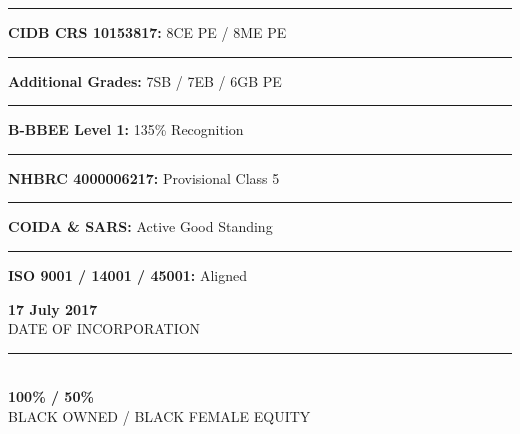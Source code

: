 \documentclass[a4paper,11pt]{article}
\providecommand{\faAward}{\faCertificate}
\begin{document}
\begin{minipage}[t]{0.34\textwidth}
    \vspace{0pt}
    \begin{tcolorbox}[
        enhanced, colback=mhoffwhite, colframe=mhnavy, boxrule=1pt, arc=4pt,
        title={\bfseries\color{white}\faAward\ Verified Credentials},
        colbacktitle=mhnavy, left=7pt, right=7pt, top=6pt, bottom=6pt,
        drop shadow=black!6
    ]
        \fontsize{8.0pt}{11.4pt}\selectfont
        \textcolor{mhnavy}{\rule{4pt}{4pt}}\hspace{4pt}\textbf{CIDB CRS 10153817:} 8CE PE / 8ME PE\\
        \textcolor{mhnavy}{\rule{4pt}{4pt}}\hspace{4pt}\textbf{Additional Grades:} 7SB / 7EB / 6GB PE\\
        \textcolor{mhnavy}{\rule{4pt}{4pt}}\hspace{4pt}\textbf{B-BBEE Level 1:} 135\% Recognition\\
        \textcolor{mhnavy}{\rule{4pt}{4pt}}\hspace{4pt}\textbf{NHBRC 4000006217:} Provisional Class 5\\
        \textcolor{mhnavy}{\rule{4pt}{4pt}}\hspace{4pt}\textbf{COIDA \& SARS:} Active Good Standing\\
        \textcolor{mhnavy}{\rule{4pt}{4pt}}\hspace{4pt}\textbf{ISO 9001 / 14001 / 45001:} Aligned
    \end{tcolorbox}

    \vspace{0.18cm}

    \begin{tcolorbox}[
        enhanced, colback=white, colframe=mhlightgray, boxrule=0.8pt, arc=4pt,
        left=6pt, right=6pt, top=6pt, bottom=6pt, halign=center,
        drop shadow=black!4
    ]
        {\fontsize{16pt}{18pt}\selectfont\bfseries\color{mhblue} 17 July 2017}\\[1pt]
        {\fontsize{7.2pt}{8.8pt}\selectfont\color{mhtextmuted}\MakeUppercase{Date of Incorporation}}\\[4pt]
        \textcolor{mhlightgray}{\rule{3.4cm}{0.6pt}}\\[4pt]
        {\fontsize{16pt}{18pt}\selectfont\bfseries\color{mhnavy} 100\% / 50\%}\\[1pt]
        {\fontsize{7.2pt}{8.8pt}\selectfont\color{mhtextmuted}\MakeUppercase{Black Owned / Black Female Equity}}
    \end{tcolorbox}
\end{minipage}
\end{document}
